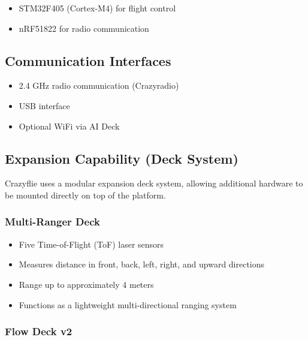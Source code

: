 \documentclass[a4paper]{article}
\begin{document}
            \begin{itemize}
                \item STM32F405 (Cortex-M4) for flight control
                \item nRF51822 for radio communication
            \end{itemize}
        
        \subsection{Communication Interfaces}
            
            \begin{itemize}
                \item 2.4 GHz radio communication (Crazyradio)
                \item USB interface
                \item Optional WiFi via AI Deck
            \end{itemize}
        
        \subsection{Expansion Capability (Deck System)}
            
            Crazyflie uses a modular expansion deck system, allowing additional hardware to be mounted directly on top of the platform.
            
            \subsubsection{Multi-Ranger Deck}
            
            \begin{itemize}
                \item Five Time-of-Flight (ToF) laser sensors
                \item Measures distance in front, back, left, right, and upward directions
                \item Range up to approximately 4 meters
                \item Functions as a lightweight multi-directional ranging system
                \end{itemize}
            
            \subsubsection{Flow Deck v2}
            
\end{document}
